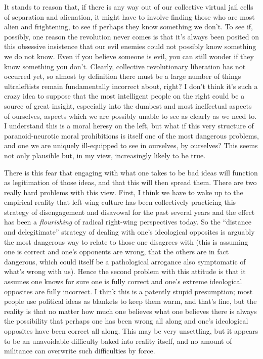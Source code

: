 \documentclass[a4paper,12pt,margin=.5in]{article}
\begin{document}
It stands to reason that, if there is any way out of our collective
virtual jail cells of separation and alienation, it might have to
involve finding those who are most alien and frightening, to see if
perhaps they know something we don't. To see if, possibly, one reason
the revolution never comes is that it's always been posited on this
obsessive insistence that our evil enemies could not possibly know
something we do not know. Even if you believe someone is evil, you can
still wonder if they know something you don't. Clearly, collective
revolutionary liberation has not occurred yet, so almost by definition
there must be a large number of things ultraleftists remain
fundamentally incorrect about, right? I don't think it's such a crazy
idea to suppose that the most intelligent people on the right could be a
source of great insight, especially into the dumbest and most
ineffectual aspects of ourselves, aspects which we are possibly unable
to see as clearly as we need to. I understand this is a moral heresy on
the left, but what if this very structure of paranoid-neurotic moral
prohibitions is itself one of the most dangerous problems, and one we
are uniquely ill-equipped to see in ourselves, by ourselves? This seems
not only plausible but, in my view, increasingly likely to be true.

There is this fear that engaging with what one takes to be bad ideas
will function as legitimation of those ideas, and that this will then
spread them. There are two really hard problems with this view. First, I
think we have to wake up to the empirical reality that left-wing culture
has been collectively practicing this strategy of disengagement and
disavowal for the past several years and the effect has been a
\emph{flourishing} of radical right-wing perspectives today. So the
``distance and delegitimate'' strategy of dealing with one's ideological
opposites is arguably the most dangerous way to relate to those one
disagrees with (this is assuming one is correct and one's opponents are
wrong, that the others are in fact dangerous, which could itself be a
pathological arrogance also symptomatic of what's wrong with us). Hence
the second problem with this attitude is that it assumes one knows for
sure one is fully correct and one's extreme ideological opposites are
fully incorrect. I think this is a patently stupid presumption; most
people use political ideas as blankets to keep them warm, and that's
fine, but the reality is that no matter how much one believes what one
believes there is always the possibility that perhaps one has been wrong
all along and one's ideological opposites have been correct all along.
This may be very unsettling, but it appears to be an unavoidable
difficulty baked into reality itself, and no amount of militance can
overwrite such difficulties by force.
\end{document}

